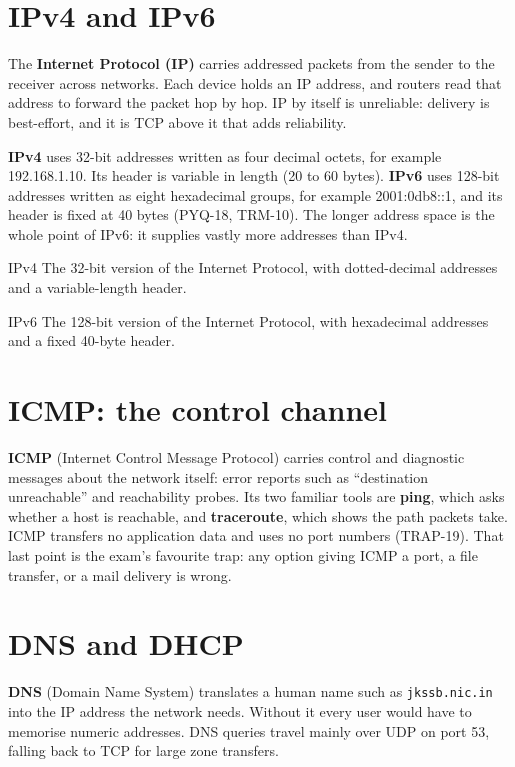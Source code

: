 \section{IPv4 and IPv6}
The \textbf{Internet Protocol (IP)} carries addressed packets from the sender
to the receiver across networks. Each device holds an IP address, and routers
read that address to forward the packet hop by hop. IP by itself is
unreliable: delivery is best-effort, and it is TCP above it that adds
reliability.

\textbf{IPv4} uses 32-bit addresses written as four decimal octets, for
example 192.168.1.10. Its header is variable in length (20 to 60 bytes).
\textbf{IPv6} uses 128-bit addresses written as eight hexadecimal groups, for
example 2001:0db8::1, and its header is fixed at 40 bytes (PYQ-18, TRM-10).
The longer address space is the whole point of IPv6: it supplies vastly more
addresses than IPv4.

\begin{definitionbox}{IPv4}
The 32-bit version of the Internet Protocol, with dotted-decimal addresses
and a variable-length header.
\end{definitionbox}

\begin{definitionbox}{IPv6}
The 128-bit version of the Internet Protocol, with hexadecimal addresses and
a fixed 40-byte header.
\end{definitionbox}

\section{ICMP: the control channel}
\textbf{ICMP} (Internet Control Message Protocol) carries control and
diagnostic messages about the network itself: error reports such as
``destination unreachable'' and reachability probes. Its two familiar tools
are \textbf{ping}, which asks whether a host is reachable, and
\textbf{traceroute}, which shows the path packets take. ICMP transfers no
application data and uses no port numbers (TRAP-19). That last point is the
exam's favourite trap: any option giving ICMP a port, a file transfer, or a
mail delivery is wrong.

\section{DNS and DHCP}
\textbf{DNS} (Domain Name System) translates a human name such as
\texttt{jkssb.nic.in} into the IP address the network needs. Without it every
user would have to memorise numeric addresses. DNS queries travel mainly over
UDP on port 53, falling back to TCP for large zone transfers.

